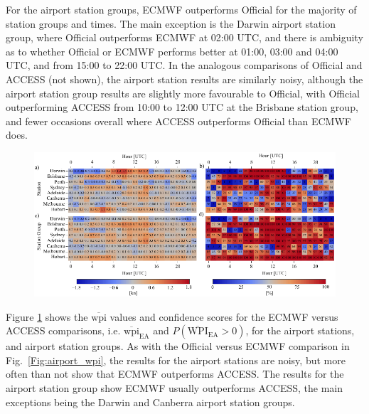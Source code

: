 \documentclass[alpha-refs]{wiley-article}
\begin{document}
For the airport station groups, ECMWF outperforms Official for the majority of station groups and times. The main exception is the Darwin airport station group, where Official outperforms ECMWF at 02:00 UTC, and there is ambiguity as to whether Official or ECMWF performs better at 01:00, 03:00 and 04:00 UTC, and from 15:00 to 22:00 UTC. In the analogous comparisons of Official and ACCESS (not shown), the airport station results are similarly noisy, although the airport station group results are slightly more favourable to Official, with Official outperforming ACCESS from 10:00 to 12:00 UTC at the Brisbane station group, and fewer occasions overall where ACCESS outperforms Official than ECMWF does. 

\begin{figure}
\centering
\includegraphics{airport_wpi_EA.pdf}
\label{Fig:airport_wpi_EA}
\end{figure}

Figure \ref{Fig:airport_wpi_EA} shows the $\overline{\text{wpi}}$ values and confidence scores for the ECMWF versus ACCESS comparisons, i.e. $\overline{\text{wpi}}_\text{EA}$ and $P\left(\overline{\text{WPI}}_\text{EA}>0\right)$, for the airport stations, and airport station groups. As with the Official versus ECMWF comparison in Fig.~\ref{Fig:airport_wpi}, the results for the airport stations are noisy, but more often than not show that ECMWF outperforms ACCESS. The results for the airport station group show ECMWF usually outperforms ACCESS, the main exceptions being the Darwin and Canberra airport station groups. 
\end{document}
